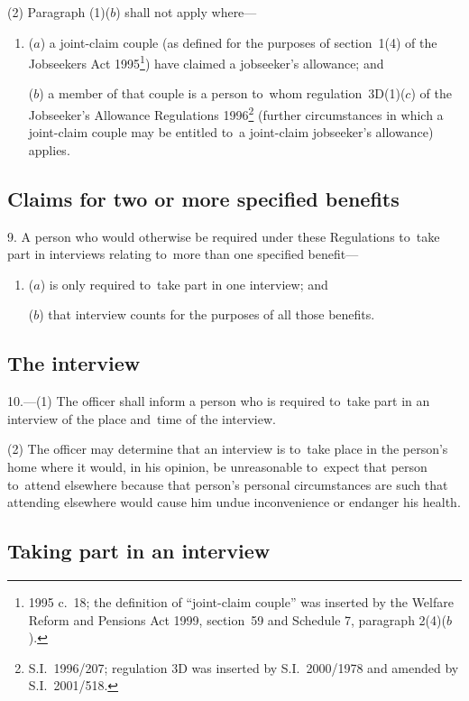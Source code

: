 \documentclass[12pt,a4paper]{article}
\begin{document}
(2) Paragraph (1)($b$)  shall not apply where—
\begin{enumerate}\item[]
($a$) a joint-claim couple (as defined for the purposes of section~1(4) of the Jobseekers Act 1995\footnote{1995 c.~18; the definition of “joint-claim couple” was inserted by the Welfare Reform and Pensions Act 1999, section~59 and Schedule 7, paragraph 2(4)($b$).}) have claimed a jobseeker’s allowance; and

($b$) a member of that couple is a person to~whom regulation~3D(1)($c$)  of the Jobseeker’s Allowance Regulations 1996\footnote{S.I.~1996/207; regulation 3D was inserted by S.I.~2000/1978 and amended by S.I.~2001/518.} (further circumstances in which a joint-claim couple may be entitled to~a joint-claim jobseeker’s allowance) applies.
\end{enumerate}

\subsection[9. Claims for two or more specified benefits]{Claims for two or more specified benefits}

9.  A person who would otherwise be required under these Regulations to~take part in interviews relating to~more than one specified benefit—
\begin{enumerate}\item[]
($a$) is only required to~take part in one interview; and

($b$) that interview counts for the purposes of all those benefits.
\end{enumerate}

\subsection[10. The interview]{The interview}

10.---(1)  The officer shall inform a person who is required to~take part in an interview of the place and~time of the interview.

(2) The officer may determine that an interview is to~take place in the person’s home where it would, in his opinion, be unreasonable to~expect that person to~attend elsewhere because that person’s personal circumstances are such that attending elsewhere would cause him undue inconvenience or endanger his health.

\subsection[11. Taking part in an interview]{Taking part in an interview}
\end{document}
